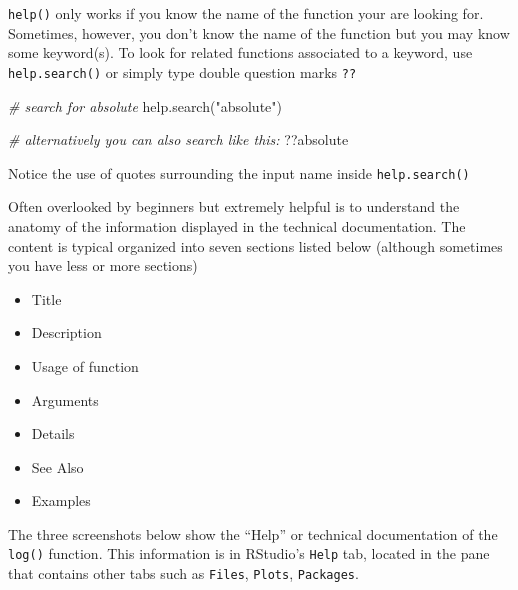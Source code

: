 \documentclass[
]{book}
\newenvironment{Shaded}{\begin{snugshade}}{\end{snugshade}}
\newcommand{\CommentTok}[1]{\textcolor[rgb]{0.56,0.35,0.01}{\textit{#1}}}
\newcommand{\FunctionTok}[1]{\textcolor[rgb]{0.00,0.00,0.00}{#1}}
\newcommand{\NormalTok}[1]{#1}
\newcommand{\StringTok}[1]{\textcolor[rgb]{0.31,0.60,0.02}{#1}}
\providecommand{\tightlist}{%
  \setlength{\itemsep}{0pt}\setlength{\parskip}{0pt}}
\begin{document}
\texttt{help()} only works if you know the name of the function your are looking for.
Sometimes, however, you don't know the name of the function but you may know
some keyword(s). To look for related functions associated to a keyword, use
\texttt{help.search()} or simply type double question marks \texttt{??}

\begin{Shaded}
\begin{Highlighting}[]
\CommentTok{\# search for \textquotesingle{}absolute\textquotesingle{}}
\FunctionTok{help.search}\NormalTok{(}\StringTok{"absolute"}\NormalTok{)}

\CommentTok{\# alternatively you can also search like this:}
\NormalTok{??absolute}
\end{Highlighting}
\end{Shaded}

Notice the use of quotes surrounding the input name inside \texttt{help.search()}

Often overlooked by beginners but extremely helpful is to understand the
anatomy of the information displayed in the technical documentation. The
content is typical organized into seven sections listed below (although
sometimes you have less or more sections)

\begin{itemize}
\tightlist
\item
  Title
\item
  Description
\item
  Usage of function
\item
  Arguments
\item
  Details
\item
  See Also
\item
  Examples
\end{itemize}

The three screenshots below show the ``Help'' or technical documentation of the
\texttt{log()} function. This information is in RStudio's \texttt{Help} tab, located in the
pane that contains other tabs such as \texttt{Files}, \texttt{Plots}, \texttt{Packages}.
\end{document}
